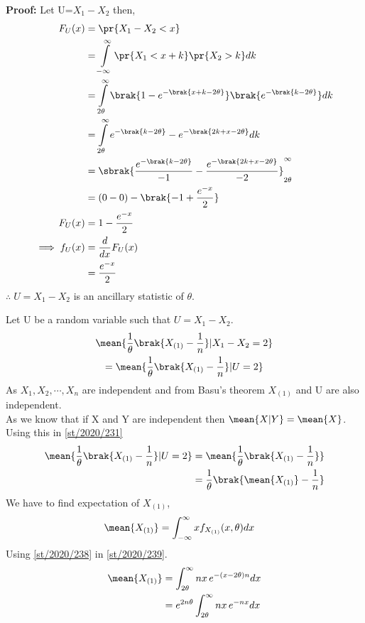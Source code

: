 \begin{enumerate}
    \textbf{Proof: }Let U=$X_1-X_2$ then,
    \begin{align}
     \nonumber   F_U(x)&=\pr{X_1-X_2<x}\\
    \nonumber
    &=\int\limits_{-\infty}^{\infty}\pr{X_1<x+k}\pr{X_2>k} dk\\
  \nonumber      &= \int\limits_{2\theta}^{\infty}\brak{1-e^{-\brak{x+k-2\theta}}}\brak{e^{-\brak{k-2\theta}}} dk\\
 \nonumber &=\int\limits_{2\theta}^{\infty}e^{-\brak{k-2\theta}}-e^{-\brak{2k+x-2\theta}} dk\\
\nonumber &= \sbrak{\frac{e^{-\brak{k-2\theta}}}{-1}-\frac{e^{-\brak{2k+x-2\theta}}}{-2}}_{2\theta}^{\infty}\\
  \nonumber  &=(0-0)-\brak{-1+\frac{e^{-x}}{2}}\\
    F_U(x)&= 1-\frac{e^{-x}}{2}\\
    \implies f_U(x)&=\dfrac{d}{dx}F_U(x)\\
    &=\frac{e^{-x}}{2}
    \end{align}
    $\therefore\;U=X_1-X_2$ is an ancillary statistic of $\theta$.
\end{enumerate}
Let U be a random variable such that $U=X_1-X_2$.
\begin{multline}
    \mean{\frac{1}{\theta}\brak{X_{(1)}-\frac{1}{n}}|X_1-X_2=2}\\=\mean{\frac{1}{\theta}\brak{X_{(1)}-\frac{1}{n}}|U=2}\label{st/2020/231}
\end{multline}
As $X_1,X_2,\cdots,X_n$ are independent and from Basu's theorem $X_{(1)}$ and U are also independent. \\As we know that if X and Y are independent then $\mean{X|Y}=\mean{X}$. 
Using this in \eqref{st/2020/231}
\begin{align}
 \nonumber   \mean{\frac{1}{\theta}\brak{X_{(1)}-\frac{1}{n}}|U=2}
    &=\mean{\frac{1}{\theta}\brak{X_{(1)}-\frac{1}{n}}}\\
    &=\frac{1}{\theta}\brak{\mean{X_{(1)}}-\frac{1}{n}}\label{st/2020/23a}
\end{align}
We have to find expectation of $X_{(1)}$,
\begin{align}
   \mean{X_{(1)}}&=\int_{-\infty}^{\infty} x f_{X_{(1)}}{(x,\theta)} dx \label{st/2020/239}
\end{align}
Using \eqref{st/2020/238} in \eqref{st/2020/239}.
\begin{align}
\nonumber \mean{X_{(1)}}&=\int_{2\theta}^{\infty} n x\,e^{-(x-2\theta)n} dx\\
  &= e^{2n\theta}\int_{2\theta}^{\infty} n x\,e^{-n x} dx \label{st/2020/2310}
\end{align}
